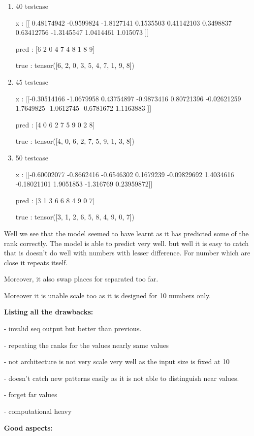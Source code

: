 \documentclass[journal,12pt,onecolumn]{IEEEtran}
\begin{document}
\begin{enumerate}
		pred :  [6 9 4 7 2 8 1 5 0 1]

		true :  tensor([6, 9, 4, 7, 3, 8, 2, 5, 0, 1])
	\item 40 testcase

		x :  [[ 0.48174942 -0.9599824  -1.8127141   0.1535503   0.41142103  0.3498837
   0.63412756 -1.3145547   1.0414461   1.015073  ]]

pred :  [6 2 0 4 7 4 8 1 8 9]

true :  tensor([6, 2, 0, 3, 5, 4, 7, 1, 9, 8])
\item 45 testcase

	x :  [[-0.30514166 -1.0679958   0.43754897 -0.9873416   0.80721396 -0.02621259
   1.7649825  -1.0612745  -0.6781672   1.1163883 ]]

pred :  [4 0 6 2 7 5 9 0 2 8]

true :  tensor([4, 0, 6, 2, 7, 5, 9, 1, 3, 8])
\item 50 testcase

	x :  [[-0.60002077 -0.8662416  -0.6546302   0.1679239  -0.09829692  1.4034616
  -0.18021101  1.9051853  -1.316769    0.23959872]]

pred :  [3 1 3 6 6 8 4 9 0 7]

true :  tensor([3, 1, 2, 6, 5, 8, 4, 9, 0, 7])
\end{enumerate}

Well we see that the model seemed to have learnt as it has predicted some of the rank correctly. The model is able to predict very well. but well it is easy to catch that is doesn't do well with numbers with lesser difference. For number which are close it repeats itself. 

Moreover, it also swap places for separated too far.

Moreover it is unable scale too as it is designed for 10 numbers only.



\textbf{Listing all the drawbacks:}

- invalid seq output but better than previous.

- repeating the ranks for the values nearly same values

- not architecture is not very scale very well as the input size is fixed at 10

- doesn't catch new patterns easily as it is not able to distinguish near values.

- forget far values

- computational heavy


\textbf{Good aspects:}
\end{document}
